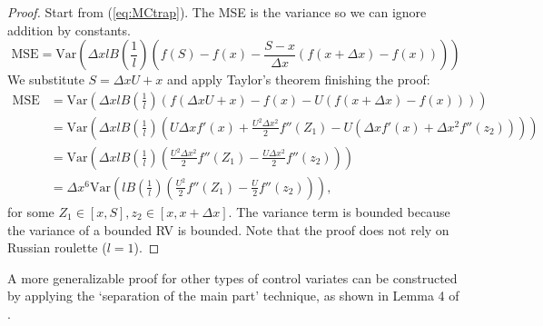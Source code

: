 \documentclass[a4paper,12pt]{article}
\begin{document}
\begin{proof}
  Start from (\ref{eq:MCtrap}). The MSE is the variance
  so we can ignore addition by constants.
  \begin{equation}
    \text{MSE} = \text{Var}\left( \Delta x l B\left( \frac{1}{l}\right)
    \left(f(S) - f(x) - \frac{S - x}{\Delta x}
    \left(f(x+\Delta x) - f(x)\right) \right)\right)
  \end{equation}
  We substitute $S = \Delta x U + x$ and apply Taylor's theorem
  finishing the proof:
  \begin{align}
    \text{MSE} & = \text{Var}\left( \Delta x l B\left( \frac{1}{l}\right)
    \left(f(\Delta x U+x) - f(x) - U
    \left(f(x+\Delta x) - f(x)\right) \right)\right)                           \\
               & = \text{Var}\left( \Delta x l B\left( \frac{1}{l}\right)
    \left( U \Delta x f'(x)+ \frac{U^{2} \Delta x ^{2}}{2} f''(Z_{1})
    - U \left( \Delta x f'(x) +
    \Delta x ^{2} f''(z_{2})\right) \right)\right)                             \\
               & = \text{Var}\left( \Delta x l B\left( \frac{1}{l}\right)
    \left( \frac{U^{2} \Delta x ^{2}}{2} f''(Z_{1})
    -  \frac{U\Delta x ^{2}}{2} f''(z_{2}) \right)\right)                      \\
               & =\Delta x ^{6} \text{Var}\left(  l B\left( \frac{1}{l}\right)
    \left( \frac{U^{2} }{2} f''(Z_{1})
    -  \frac{U}{2} f''(z_{2}) \right)\right),
  \end{align}
  for some $Z_{1} \in [x,S], z_{2} \in [x,x+\Delta x]$. The variance term is bounded
  because the variance of a bounded RV is bounded.
  Note that the proof does not rely on Russian roulette ($l=1$).
\end{proof}

\begin{related}
  A more generalizable proof for other types of control variates can
  be constructed by applying the \enquote*{separation of the main part} technique,
  as shown in Lemma 4 of \cite{heinrich_monte_1993}.
\end{related}
\end{document}
